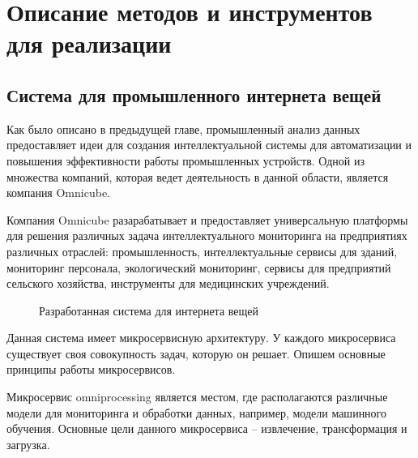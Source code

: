 \section{Описание методов и инструментов для реализации}

\subsection{Система для промышленного интернета вещей}

Как было описано в предыдущей главе,
промышленный анализ данных предоставляет идеи для создания
интеллектуальной системы для автоматизации и повышения
эффективности работы промышленных устройств.
Одной из множества компаний, которая ведет деятельность в данной области,
является компания Omnicube.

Компания Omnicube разарабатывает и предоставляет универсальную платформы
для решения различных задача интеллектуального мониторинга
на предприятиях различных отраслей: промышленность,
интеллектуальные сервисы для зданий, мониторинг персонала,
экологический мониторинг, сервисы для предприятий сельского хозяйства,
инструменты для медицинских учреждений. \cite{omnicube}

\begin{figure}[h]
    \caption{Разработанная система для интернета вещей}
\end{figure}

Данная система имеет микросервисную архитектуру.
У каждого микросервиса существует своя совокупность задач,
которую он решает. Опишем основные принципы работы микросервисов.

Микросервис omniprocessing является местом, где располагаются различные модели для мониторинга и обработки данных,
например, модели машинного обучения.
Основные цели данного микросервиса -- извлечение, трансформация и загрузка.

